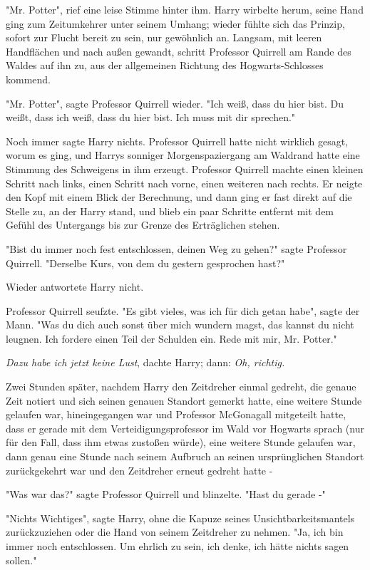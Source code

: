 {"Mr. Potter", rief eine leise Stimme hinter ihm. Harry wirbelte herum, seine Hand ging zum Zeitumkehrer unter seinem Umhang; wieder fühlte sich das Prinzip, sofort zur Flucht bereit zu sein, nur gewöhnlich an. Langsam, mit leeren Handflächen und nach außen gewandt, schritt Professor Quirrell am Rande des Waldes auf ihn zu, aus der allgemeinen Richtung des Hogwarts-Schlosses kommend.

"Mr. Potter", sagte Professor Quirrell wieder. "Ich weiß, dass du hier bist. Du weißt, dass ich weiß, dass du hier bist. Ich muss mit dir sprechen."

Noch immer sagte Harry nichts. Professor Quirrell hatte nicht wirklich gesagt, worum es ging, und Harrys sonniger Morgenspaziergang am Waldrand hatte eine Stimmung des Schweigens in ihm erzeugt. Professor Quirrell machte einen kleinen Schritt nach links, einen Schritt nach vorne, einen weiteren nach rechts. Er neigte den Kopf mit einem Blick der Berechnung, und dann ging er fast direkt auf die Stelle zu, an der Harry stand, und blieb ein paar Schritte entfernt mit dem Gefühl des Untergangs bis zur Grenze des Erträglichen stehen.

"Bist du immer noch fest entschlossen, deinen Weg zu gehen?" sagte Professor Quirrell. "Derselbe Kurs, von dem du gestern gesprochen hast?"

Wieder antwortete Harry nicht.

Professor Quirrell seufzte. "Es gibt vieles, was ich für dich getan habe", sagte der Mann. "Was du dich auch sonst über mich wundern magst, das kannst du nicht leugnen. Ich fordere einen Teil der Schulden ein. Rede mit mir, Mr. Potter."

\emph{Dazu habe ich jetzt keine Lust}, dachte Harry; dann: \emph{Oh, richtig.}

Zwei Stunden später, nachdem Harry den Zeitdreher einmal gedreht, die genaue Zeit notiert und sich seinen genauen Standort gemerkt hatte, eine weitere Stunde gelaufen war, hineingegangen war und Professor McGonagall mitgeteilt hatte, dass er gerade mit dem Verteidigungsprofessor im Wald vor Hogwarts sprach (nur für den Fall, dass ihm etwas zustoßen würde), eine weitere Stunde gelaufen war, dann genau eine Stunde nach seinem Aufbruch an seinen ursprünglichen Standort zurückgekehrt war und den Zeitdreher erneut gedreht hatte -

"Was war das?" sagte Professor Quirrell und blinzelte. "Hast du gerade -"

"Nichts Wichtiges", sagte Harry, ohne die Kapuze seines Unsichtbarkeitsmantels zurückzuziehen oder die Hand von seinem Zeitdreher zu nehmen. "Ja, ich bin immer noch entschlossen. Um ehrlich zu sein, ich denke, ich hätte nichts sagen sollen."

}
